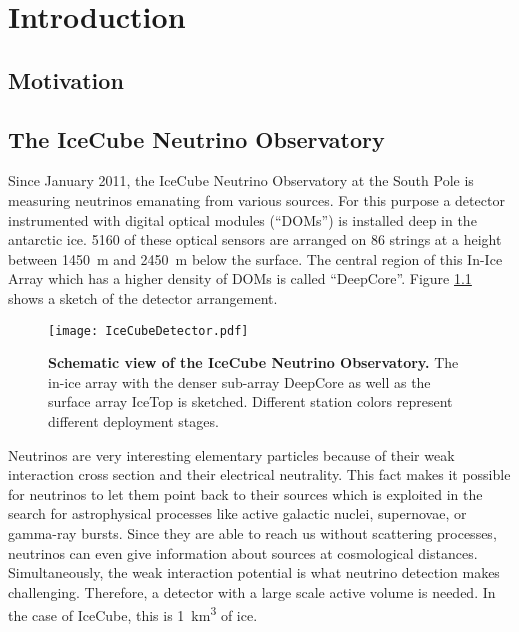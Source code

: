 \chapter{Introduction}


\section{Motivation}


\section{The IceCube Neutrino Observatory}

Since January 2011, the IceCube Neutrino Observatory at the South Pole is measuring neutrinos emanating from various sources. For this purpose a detector instrumented with digital optical modules (\enquote{DOMs}) is installed deep in the antarctic ice. 5160 of these optical sensors are arranged on 86 strings at a height between \SI{1450}{\meter} and \SI{2450}{\meter} below the surface. The central region of this In-Ice Array which has a higher density of DOMs is called \enquote{DeepCore}. Figure \ref{icecube:detector} shows a sketch of the detector arrangement.

\begin{figure}[h]
	\texttt{[image: IceCubeDetector.pdf]}
	\caption[Schematic view of IceCube]{\textbf{Schematic view of the IceCube Neutrino Observatory.} \cite{icecube:instrumentation} The in-ice array with the denser sub-array DeepCore as well as the surface array IceTop is sketched. Different station colors represent different deployment stages.}
	\label{icecube:detector}
\end{figure}

Neutrinos are very interesting elementary particles because of their weak interaction cross section and their electrical neutrality. This fact makes it possible for neutrinos to let them point back to their sources which is exploited in the search for astrophysical processes like active galactic nuclei, supernovae, or gamma-ray bursts. Since they are able to reach us without scattering processes, neutrinos can even give information about sources at cosmological distances. Simultaneously, the weak interaction potential is what neutrino detection makes challenging. Therefore, a detector with a large scale active volume is needed. In the case of IceCube, this is \SI{1}{\cubic\kilo\meter} of ice.

